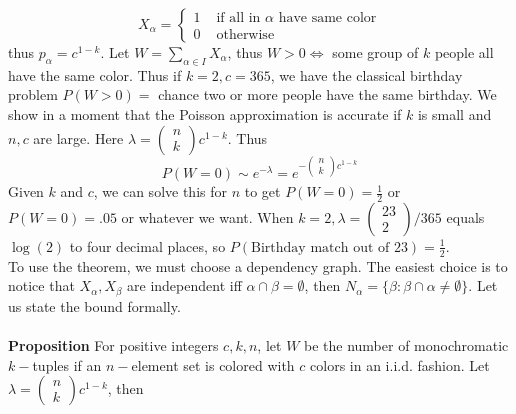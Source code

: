 \documentclass[12pt]{article}
\begin{document}
$$X_{\alpha} = \begin{cases}
	1 & \text{ if all in $\alpha$ have same color}\\
	0 & \text{ otherwise}
\end{cases}$$
thus $p_{\alpha} = c^{1 - k}$. Let $W = \sum_{\alpha \in I}X_{\alpha}$, thus $W > 0 \Leftrightarrow $ some group of $k$ people all have the same color. Thus if $k = 2, c = 365$, we have the classical birthday problem $P(W > 0) = $ chance two or more people have the same birthday. We show in a moment that the Poisson approximation is accurate if $k$ is small and $n, c$ are large. Here $\lambda = \left(\begin{array}{c}
n\\
k\end{array}\right)c^{1 - k}$. Thus
$$P(W = 0) \sim e^{-\lambda} = e^{-\left(\begin{array}{c}
n\\
k\end{array}\right)c^{1 - k}}$$
Given $k$ and $c$, we can solve this for $n$ to get $P(W = 0) = \frac{1}{2}$ or $P(W = 0) = .05$ or whatever we want. When $k = 2, \lambda = \left(\begin{array}{c}
23\\
2\end{array}\right)/365$ equals $\log(2)$ to four decimal places, so $P(\text{Birthday match out of 23}) = \frac{1}{2}$.\\
To use the theorem, we must choose a dependency graph. The easiest choice is to notice that $X_{\alpha}, X_{\beta}$ are independent iff $\alpha \cap \beta = \emptyset$, then $N_{\alpha} = \{\beta: \beta\cap \alpha \neq \emptyset\}$. Let us state the bound formally.\\
\\
\textbf{Proposition} For positive integers $c, k, n$, let $W$ be the number of monochromatic $k-$tuples if an $n-$element set is colored with $c$ colors in an i.i.d. fashion. Let $\lambda = \left(\begin{array}{c}
n\\
k\end{array}\right)c^{1 - k}$, then
\end{document}
